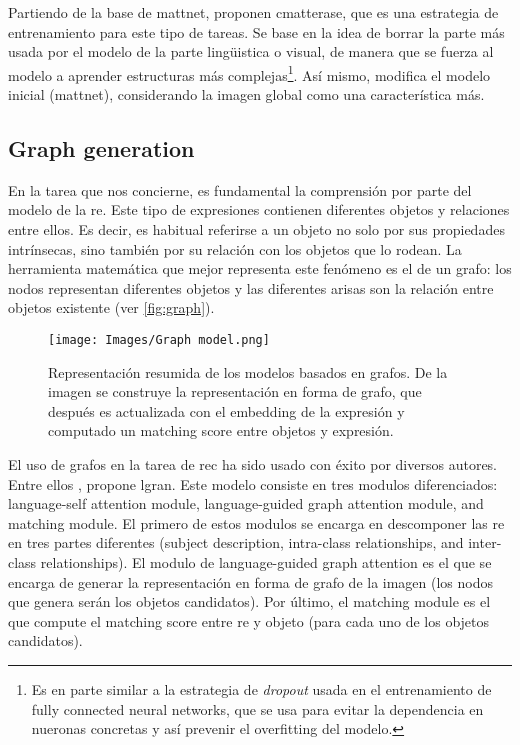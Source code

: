 Partiendo de la base de \gls{mattnet},
 proponen
\gls{cmatterase}, que es una estrategia de entrenamiento para este tipo de
tareas. Se base en la idea de borrar la parte más usada por el modelo de la
parte lingüistica o visual, de manera que se fuerza al modelo a aprender
estructuras más complejas\footnote{Es en parte similar a la estrategia de
  \emph{dropout} usada en el entrenamiento de fully connected neural networks,
  que se usa para evitar la dependencia en nueronas concretas y así prevenir el
  overfitting del modelo.}. Así mismo, modifica el modelo inicial
(\gls{mattnet}), considerando la imagen global como una característica más.

\subsection{Graph generation} \label{sec:graph}
En la tarea que nos concierne, es fundamental la comprensión por parte del
modelo de la \gls{re}. Este tipo de expresiones contienen diferentes objetos y
relaciones entre ellos. Es decir, es habitual referirse a un objeto no solo por
sus propiedades intrínsecas, sino también por su relación con los objetos que
lo rodean. La herramienta matemática que mejor representa este fenómeno es el
de un grafo: los nodos representan diferentes objetos y las diferentes arisas
son la relación entre objetos existente (ver \vref{fig:graph}).

\begin{figure}[ht]
  \centering
  \texttt{[image: Images/Graph model.png]}
  \caption[Graph based model representation]{Representación resumida de los
    modelos basados en grafos. De la imagen se construye la representación en
    forma de grafo, que después es actualizada con el embedding de la expresión
    y computado un matching score entre objetos y expresión.}
  \label{fig:graph}
\end{figure}

El uso de grafos en la tarea de \gls{rec} ha sido usado con éxito por diversos
autores. Entre ellos , propone \gls{lgran}. Este modelo
consiste en tres modulos diferenciados: language-self attention module,
language-guided graph attention module, and matching module. El primero de
estos modulos se encarga en descomponer las \gls{re} en tres partes diferentes
(subject description, intra-class relationships, and inter-class
relationships). El modulo de language-guided graph attention es el que se
encarga de generar la representación en forma de grafo de la imagen (los nodos
que genera serán los objetos candidatos). Por último, el matching module es el
que compute el matching score entre \gls{re} y objeto (para cada uno de los
objetos candidatos).

